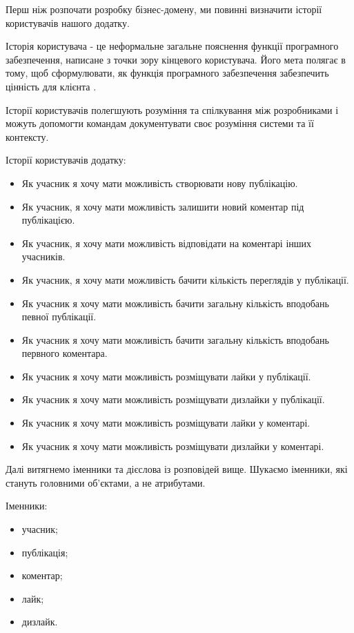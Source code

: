 Перш ніж розпочати розробку бізнес-домену, ми повинні визначити
історії користувачів нашого додатку.

Історія користувача - це неформальне загальне пояснення функції
програмного забезпечення, написане з точки зору кінцевого користувача.
Його мета полягає в тому, щоб сформулювати, як функція програмного
забезпечення забезпечить цінність для клієнта \cite{user-story-article}.

Історії користувачів полегшують розуміння та спілкування між розробниками і можуть допомогти командам
документувати своє розуміння системи та її контексту.

Історії користувачів додатку:
\begin{itemize}
		\item Як учасник я хочу мати можливість створювати нову публікацію.
		\item Як учасник, я хочу мати можливість залишити новий коментар під публікацією.
		\item Як учасник, я хочу мати можливість відповідати на коментарі інших учасників.
		\item Як учасник, я хочу мати можливість бачити кількість переглядів у публікації.
		\item Як учасник я хочу мати можливість бачити загальну кількість вподобань певної публікації.
		\item Як учасник я хочу мати можливість бачити загальну кількість вподобань первного коментара.
		\item Як учасник я хочу мати можливість розміщувати лайки у публікації.
		\item Як учасник я хочу мати можливість розміщувати дизлайки у публікації.
		\item Як учасник я хочу мати можливість розміщувати лайки у коментарі.
		\item Як учасник я хочу мати можливість розміщувати дизлайки у коментарі.
\end{itemize}

Далі витягнемо іменники та дієслова із розповідей вище.
Шукаємо іменники, які стануть головними об'єктами, а не атрибутами.

Іменники:
\begin{itemize}
		\item учасник;
		\item публікація;
		\item коментар;
		\item лайк;
		\item дизлайк.
\end{itemize}

